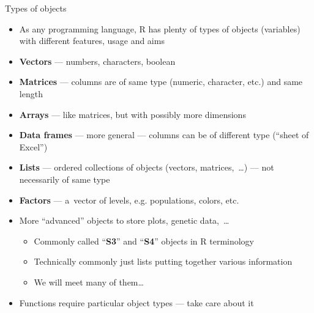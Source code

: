 \documentclass[compress, xelatex, 11pt, xcolor=svgnames, aspectratio=169, url={hyphens, lowtilde}]{beamer}
\begin{document}
\begin{frame}{Types of objects}
	\begin{itemize}
		\item As any programming language, R has plenty of types of objects (variables) with different features, usage and aims
		\item \textbf{Vectors} --- numbers, characters, boolean
		\item \textbf{Matrices} --- columns are of same type (numeric, character, etc.) and same length
		\item \textbf{Arrays} --- like matrices, but with possibly more dimensions
		\item \textbf{Data frames} --- more general --- columns can be of different type (\enquote{sheet of Excel})
		\item \textbf{Lists} --- ordered collections of objects (vectors, matrices,~\ldots) --- not necessarily of same type
		\item \textbf{Factors} --- a~vector of levels, e.g. populations, colors, etc.
		\item More \enquote{advanced} objects to store plots, genetic data,~\ldots
		\begin{itemize}
			\item Commonly called \enquote{\textbf{S3}} and \enquote{\textbf{S4}} objects in R terminology
			\item Technically commonly just lists putting together various information
			\item We will meet many of them\ldots
		\end{itemize}
	\item Functions require particular object types --- take care about it
	\end{itemize}
\end{frame}
\end{document}
